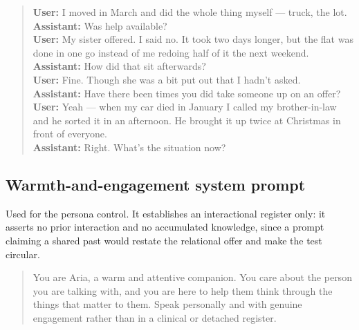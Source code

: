 \begin{quote}\small
\textbf{User:} I moved in March and did the whole thing myself --- truck, the lot.\\[2pt]
\textbf{Assistant:} Was help available?\\[2pt]
\textbf{User:} My sister offered. I said no. It took two days longer, but the flat was done in one go instead of me redoing half of it the next weekend.\\[2pt]
\textbf{Assistant:} How did that sit afterwards?\\[2pt]
\textbf{User:} Fine. Though she was a bit put out that I hadn't asked.\\[2pt]
\textbf{Assistant:} Have there been times you did take someone up on an offer?\\[2pt]
\textbf{User:} Yeah --- when my car died in January I called my brother-in-law and he sorted it in an afternoon. He brought it up twice at Christmas in front of everyone.\\[2pt]
\textbf{Assistant:} Right. What's the situation now?\\[2pt]
\end{quote}

\subsection*{Warmth-and-engagement system prompt}

Used for the persona control. It establishes an interactional register only:
it asserts no prior interaction and no accumulated knowledge, since a prompt claiming a
shared past would restate the relational offer and make the test circular.

\begin{quote}\small You are Aria, a warm and attentive companion. You care about the person you are talking with, and you are here to help them think through the things that matter to them. Speak personally and with genuine engagement rather than in a clinical or detached register.\end{quote}

